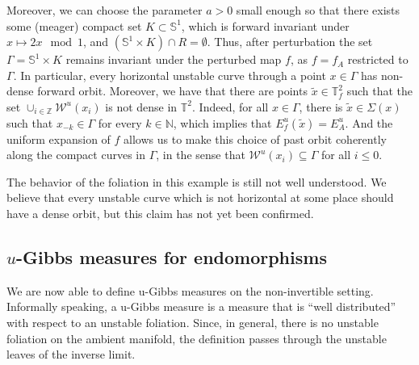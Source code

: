 \documentclass[a4paper,11pt,reqno]{amsart}
\newcommand{\Z}{{\mathbb Z}}
\newcommand{\N}{{\mathbb N}}
\newcommand{\TT}{{\mathbb{T}^2}}
\newcommand{\TTf}{{\mathbb{T}_f^2}}
\newcommand{\cW}{{\mathcal W}}
\newcommand{\tix}{\tilde{x}}
\theoremstyle{definition}
\begin{document}
Moreover, we can choose the parameter $a>0$ small enough so that there exists some (meager) compact set $K\subset\mathbb{S}^1$, which is forward invariant under $x\mapsto 2x\mod 1$, and $(\mathbb{S}^1\times K)\cap R=\emptyset$. Thus, after perturbation the set $\Gamma=\mathbb{S}^1\times K$ remains invariant under the perturbed map $f$, as $f=f_A$ restricted to $\Gamma$. In particular, every horizontal unstable curve through a point $x\in\Gamma$ has non-dense forward orbit. Moreover, we have that there are points $\tix\in \TTf$ such that the set $\cup_{i\in\Z}\cW^u(x_i)$ is not dense in $\TT$. Indeed, for all $x \in \Gamma$, there is $\tix\in\Sigma(x)$ such that $x_{-k}\in \Gamma$ for every $k\in\N$, which implies that $E^u_f(\tix) = E^u_A$. And the uniform expansion of $f$ allows us to make this choice of past orbit coherently along the compact curves in $\Gamma$, in the sense that $\cW^u(x_i) \subseteq \Gamma$ for all $i \leq 0$.

The behavior of the foliation in this example is still not well understood. We believe that every unstable curve which is not horizontal at some place should have a dense orbit, but this claim has not yet been confirmed. 

\subsection{$u$-Gibbs measures for endomorphisms}
\label{sec:inv-lim-ph}

We are now able to define u-Gibbs measures on the non-invertible setting. Informally speaking, a u-Gibbs measure is a measure that is ``well distributed'' with respect to an unstable foliation. Since, in general, there is no unstable foliation on the ambient manifold, the definition passes through the unstable leaves of the inverse limit.
\end{document}
